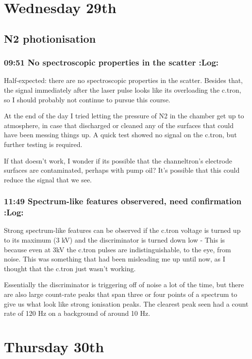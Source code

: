 \documentclass[11pt]{article}
\begin{document}
\section*{Wednesday 29th}
\label{sec-13}
\subsection*{N2 photionisation}
\label{sec-13-1}
\subsubsection*{09:51 No spectroscopic properties in the scatter \textbf{:Log:}}
\label{sec-13-1-1}

Half-expected: there are no spectroscopic properties in the
scatter. Besides that, the signal immediately after the laser pulse
looks like its overloading the c.tron, so I should probably not
continue to pursue this course. 

At the end of the day I tried letting the pressure of N2 in the
chamber get up to atmosphere, in case that discharged or cleaned any
of the surfaces that could have been messing things up. A quick test
showed no signal on the c.tron, but further testing is required.

If that doesn't work, I wonder if its possible that the channeltron's
electrode surfaces are contaminated, perhaps with pump oil? It's
possible that this could reduce the signal that we see.
\subsubsection*{11:49 Spectrum-like features observered, need confirmation \textbf{:Log:}}
\label{sec-13-1-2}

Strong spectrum-like features can be observed if the c.tron voltage is
turned up to its maximum (3 kV) and the discriminator is turned down
low - This is because even at 3kV the c.tron pulses are
indistinguishable, to the eye, from noise. This was something that had
been misleading me up until now, as I thought that the c.tron just
wasn't working.

Essentially the discriminator is triggering off of noise a lot of the
time, but there are also large count-rate peaks that span three or
four points of a spectrum to give us what look like strong ionisation
peaks. The clearest peak seen had a count rate of 120 Hz on a background
of around 10 Hz.
\section*{Thursday 30th}
\label{sec-14}
\end{document}
